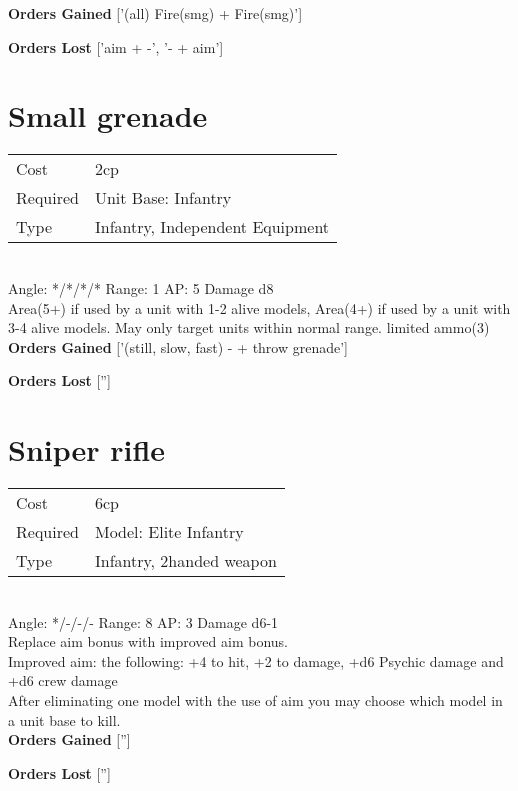 {\bf Orders Gained}
['(all) Fire(smg) + Fire(smg)']

{\bf Orders Lost}
['aim + -', '- + aim']
\section{ Small grenade }

\begin{tabular}{ll}
    Cost & 2cp \\
    Required & Unit Base: Infantry\\
    Type & Infantry, Independent Equipment\\
\end{tabular}
\ \\
\indent Angle: */*/*/* Range: 1  AP: 5 Damage d8 \\
Area(5+) if used by a unit with 1-2 alive models, Area(4+) if used by a unit with 3-4 alive models. May only target units within normal range. limited ammo(3)
\ \\

{\bf Orders Gained}
['(still, slow, fast) - + throw grenade']

{\bf Orders Lost}
['']
\section{ Sniper rifle }

\begin{tabular}{ll}
    Cost & 6cp \\
    Required & Model: Elite Infantry\\
    Type & Infantry, 2handed weapon\\
\end{tabular}
\ \\
\indent Angle: */-/-/- Range: 8  AP: 3 Damage d6-1 \\
Replace aim bonus with improved aim bonus. \\ Improved aim: the following: +4 to hit, +2 to damage, +d6 Psychic damage and +d6 crew damage\\ After eliminating one model with the use of aim you may choose which model in a unit base to kill.
\ \\

{\bf Orders Gained}
['']

{\bf Orders Lost}
['']

